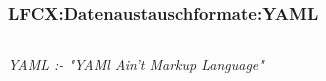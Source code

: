 \begin{frame}[fragile]  
  \frametitle{LFCX:Datenaustauschformate:YAML}
  \begin{center}
  \begin{minipage}{0.6\textwidth}
    \inputminted[fontsize=\footnotesize,linenos]{yaml}{\snpLf/cx-dff-measure.yaml}   
  \end{minipage}
  \end{center}
  
  \vspace{0.6cm}
  \begin{flushright}
    \begin{tiny}
      \textrm{\textit{ YAML :- "YAMl Ain't Markup Language"}}
    \end{tiny}
  \end{flushright}
\end{frame}



